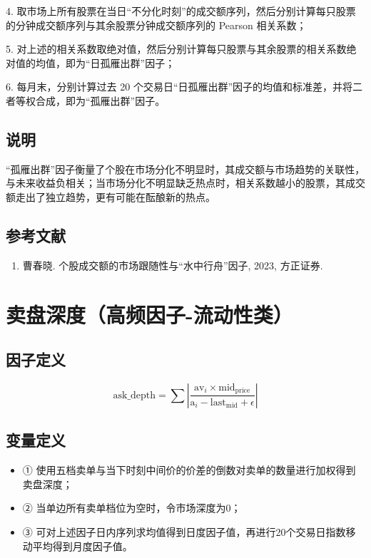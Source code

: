 \documentclass{article}
\begin{document}
4. 取市场上所有股票在当日“不分化时刻”的成交额序列，然后分别计算每只股票的分钟成交额序列与其余股票分钟成交额序列的 Pearson 相关系数；

5. 对上述的相关系数取绝对值，然后分别计算每只股票与其余股票的相关系数绝对值的均值，即为“日孤雁出群”因子；

6. 每月末，分别计算过去 20 个交易日“日孤雁出群”因子的均值和标准差，并将二者等权合成，即为“孤雁出群”因子。

\subsection{说明}
“孤雁出群”因子衡量了个股在市场分化不明显时，其成交额与市场趋势的关联性，与未来收益负相关；当市场分化不明显缺乏热点时，相关系数越小的股票，其成交额走出了独立趋势，更有可能在酝酿新的热点。

\subsection{参考文献}
\begin{enumerate}
    \item 曹春晓. 个股成交额的市场跟随性与“水中行舟”因子, 2023, 方正证券.
\end{enumerate}

\section{卖盘深度（高频因子-流动性类）}

\subsection{因子定义}
\begin{equation}
    \mathrm{ask\_depth} = \sum \left| \frac{\mathrm{av}_i \times \mathrm{mid_{price}}}{\mathrm{a}_i - \mathrm{last_{mid}}+ \epsilon} \right| 
\end{equation}

\subsection{变量定义}
\begin{itemize}
    \item ① 使用五档卖单与当下时刻中间价的价差的倒数对卖单的数量进行加权得到卖盘深度；
    \item ② 当单边所有卖单档位为空时，令市场深度为0；
    \item ③ 可对上述因子日内序列求均值得到日度因子值，再进行20个交易日指数移动平均得到月度因子值。
\end{itemize}
\end{document}
